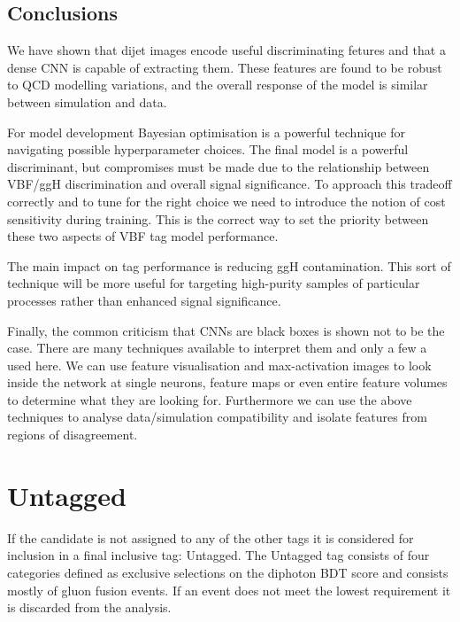 \subsection{Conclusions}
We have shown that dijet images encode useful discriminating fetures and that a dense CNN is capable of extracting them. These features are found to be robust to QCD modelling variations, and the overall response of the model is similar between simulation and data. 

For model development Bayesian optimisation is a powerful technique for navigating possible hyperparameter choices. The final model is a powerful discriminant, but compromises must be made due to the relationship between VBF/ggH discrimination and overall signal significance. 
To approach this tradeoff correctly and to tune for the right choice we need to introduce the notion of cost sensitivity during training. This is the correct way to set the priority between these two aspects of VBF tag model performance. 

The main impact on tag performance is reducing ggH contamination. This sort of technique will be more useful for targeting high-purity samples of particular processes rather than enhanced signal significance. 

Finally, the common criticism that CNNs are black boxes is shown not to be the case. There are many techniques available to interpret them and only a few a used here. We can use feature visualisation and max-activation images to look inside the network at single neurons, feature maps or even entire feature volumes to determine what they are looking for. 
Furthermore we can use the above techniques to analyse data/simulation compatibility and isolate features from regions of disagreement. 


\section[Untagged]{Untagged}
If the candidate is not assigned to any of the other tags it is considered for inclusion in a final inclusive tag: Untagged. 
The Untagged tag consists of four categories defined as exclusive selections on the diphoton BDT score and consists mostly of gluon fusion events. 
If an event does not meet the lowest requirement it is discarded from the analysis.






